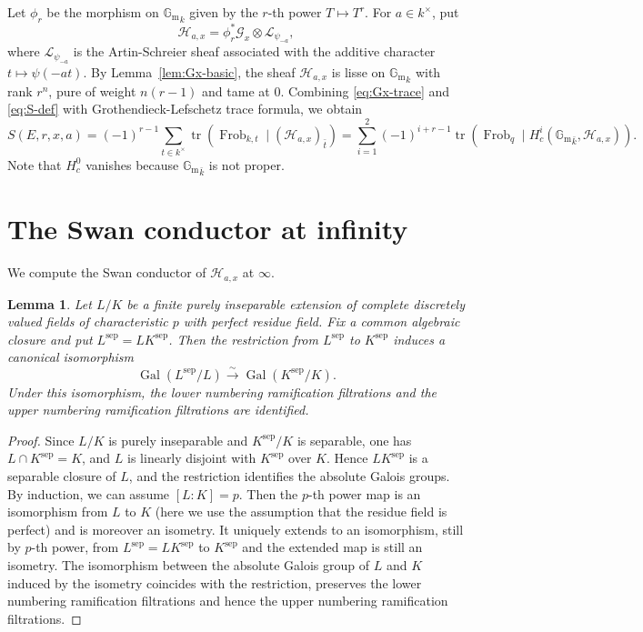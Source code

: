 \documentclass[11pt]{amsart}
\newtheorem{lemma}[theorem]{Lemma}
\theoremstyle{remark}
\newcommand{\Gm}{\mathbb G_{\mathrm m}}
\newcommand{\Frob}{\operatorname{Frob}}
\newcommand{\Gal}{\operatorname{Gal}}
\newcommand{\cL}{\mathcal L}
\newcommand{\cG}{\mathcal G}
\newcommand{\cH}{\mathcal H}
\begin{document}
Let $\phi_r$ be the morphism on ${\Gm}_k$ given by the $r$-th power $T\mapsto T^r$. For $a\in k^{\times}$, put
\begin{equation}\label{eq:H-def}
    \cH_{a,x}=\phi_r^*\cG_x\otimes\cL_{\psi_{-a}},
\end{equation}
where $\cL_{\psi_{-a}}$ is the Artin-Schreier sheaf associated with the additive character $t\mapsto\psi(-at)$. By Lemma~\ref{lem:Gx-basic}, the sheaf $\cH_{a,x}$ is lisse on ${\Gm}_k$ with rank $r^n$, pure of weight $n(r-1)$ and tame at $0$. Combining \eqref{eq:Gx-trace} and \eqref{eq:S-def} with Grothendieck-Lefschetz trace formula, we obtain
\begin{equation}\label{eq:GL trace formula}
S(E,r,x,a)= (-1)^{r-1}\sum_{t\in k^{\times}}\operatorname{tr}\left(\Frob_{k,t}\mid(\cH_{a,x})_{\bar{t}}\right)=\sum_{i=1}^2 (-1)^{i+r-1}\operatorname{tr}\left(\Frob_q\mid H_{c}^i({\Gm}_{\bar{k}},\cH_{a,x})\right).
\end{equation}
Note that $H_{c}^0$ vanishes because ${\Gm}_{\bar{k}}$ is not proper.

\section{The Swan conductor at infinity}\label{sec:swan}

We compute the Swan conductor of $\cH_{a,x}$ at $\infty$.

\begin{lemma}\label{lem:pure-insep}
Let $L/K$ be a finite purely inseparable extension of complete discretely valued fields of characteristic $p$ with perfect residue field. Fix a common algebraic closure and put $L^{\mathrm{sep}}=LK^{\mathrm{sep}}$. Then the restriction from $L^{\mathrm{sep}}$ to $K^{\mathrm{sep}}$ induces a canonical isomorphism
\[
\Gal(L^{\mathrm{sep}}/L)\xrightarrow{\sim}\Gal(K^{\mathrm{sep}}/K).
\]
Under this isomorphism, the lower numbering ramification filtrations and the upper numbering ramification filtrations are identified.  
\end{lemma}

\begin{proof}
Since $L/K$ is purely inseparable and $K^{\mathrm{sep}}/K$ is separable, one has
$L\cap K^{\mathrm{sep}}=K$, and $L$ is linearly disjoint with $K^{\mathrm{sep}}$ over $K$. Hence $LK^{\mathrm{sep}}$ is a separable closure
of $L$, and the restriction identifies the absolute Galois groups. By induction, we can assume $[L:K]=p$. Then the $p$-th power map is an isomorphism from $L$ to $K$ (here we use the assumption that the residue field is perfect) and is moreover an isometry. It uniquely extends to an isomorphism, still by $p$-th power, from $L^{\mathrm{sep}}=LK^{\mathrm{sep}}$ to $K^{\mathrm{sep}}$ and the extended map is still an isometry. The isomorphism between the absolute Galois group of $L$ and $K$ induced by the isometry coincides with the restriction, preserves the lower numbering ramification filtrations and hence the upper numbering ramification filtrations.
\end{proof}
\end{document}
